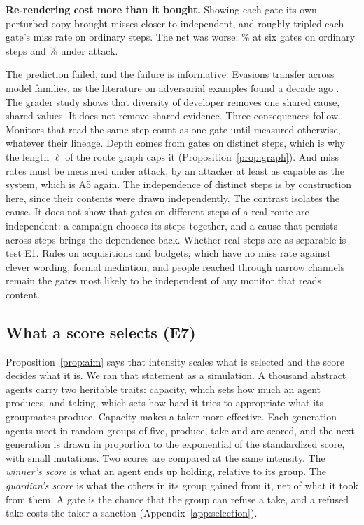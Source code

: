 \documentclass[10pt,twocolumn]{article}
\theoremstyle{plain}
\theoremstyle{definition}
\newcommand{\para}[1]{\smallskip\noindent\textbf{#1}\enspace}
\begin{document}
\para{Re-rendering cost more than it bought.} Showing each gate its own perturbed copy
brought misses closer to independent, and roughly tripled each gate's miss rate on ordinary
steps. The net was worse:
\MonNatJointRerendSix\% at six gates on ordinary steps and \MonJointRerendSix\% under attack.

The prediction failed, and the failure is informative. Evasions transfer across model
families, as the literature on adversarial examples found a decade ago
\cite{papernot2016,tramer2017}. The grader study \cite{anthropic2026judges} shows that
diversity of developer removes one shared cause, shared values. It does not remove shared
evidence. Three consequences follow. Monitors that read the same step count as one gate
until measured otherwise, whatever their lineage. Depth comes from gates on distinct steps,
which is why the length $\ell$ of the route graph caps it (Proposition~\ref{prop:graph}). And
miss rates must be measured under attack, by an attacker at least as capable as the system,
which is A5 again. The independence of distinct steps is by construction here, since their
contents were drawn independently. The contrast isolates the cause. It does not show that
gates on different steps of a real route are independent: a campaign chooses its steps
together, and a cause that persists across steps brings the dependence back. Whether real
steps are as separable is test E1. Rules on acquisitions and budgets, which have no
miss rate against clever wording, formal mediation, and people reached through narrow
channels remain the gates most likely to be independent of any monitor that reads content.

\subsection{What a score selects (E7)}\label{sec:expE}

Proposition~\ref{prop:aim} says that intensity scales what is selected and the score decides
what it is. We ran that statement as a simulation. A thousand abstract agents carry two
heritable traits: capacity, which sets how much an agent produces, and taking, which sets how
hard it tries to appropriate what its groupmates produce. Capacity makes a taker more
effective. Each generation agents meet in random groups of five, produce, take and are
scored, and the next generation is drawn in proportion to the exponential of the
standardized score, with small mutations. Two scores are compared at the same intensity. The
\emph{winner's score} is what an agent ends up holding, relative to its group. The
\emph{guardian's score} is what the others in its group gained from it, net of what it took
from them. A gate is the chance that the group can refuse a take, and a refused take costs
the taker a sanction (Appendix~\ref{app:selection}).
\end{document}
